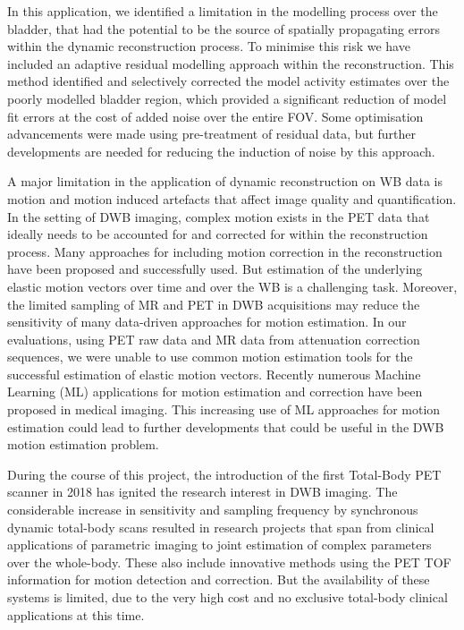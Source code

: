 In this application, we identified a limitation in the modelling process over the bladder, that had the potential to be the source of spatially propagating errors within the dynamic reconstruction process. 
To minimise this risk we have included an adaptive residual modelling approach within the reconstruction. This method identified and selectively corrected the model activity estimates over the poorly modelled bladder region, which provided a significant reduction of model fit errors at the cost of added noise over the entire FOV. Some optimisation advancements were made using pre-treatment of residual data, but further developments are needed for reducing the induction of noise by this approach. 

A major limitation in the application of dynamic reconstruction on WB data is motion and motion induced artefacts that affect image quality and quantification. 
In the setting of DWB imaging, complex motion exists in the PET data that ideally needs to be accounted for and corrected for within the reconstruction process. 
Many approaches for including motion correction in the reconstruction have been proposed and successfully used. But estimation of the underlying elastic motion vectors over time and over the WB is a challenging task. Moreover, the limited sampling of MR and PET in DWB acquisitions may reduce the sensitivity of many data-driven approaches for motion estimation. In our evaluations, using PET raw data and MR data from attenuation correction sequences, we were unable to use common motion estimation tools for the successful estimation of elastic motion vectors.
Recently numerous Machine Learning (ML) applications for motion estimation and correction have been proposed in medical imaging. This increasing use of ML approaches for motion estimation could lead to further developments that could be useful in the DWB motion estimation problem.

During the course of this project, the introduction of the first Total-Body PET scanner in 2018 has ignited the research interest in DWB imaging. The considerable increase in sensitivity and sampling frequency by synchronous dynamic total-body scans resulted in research projects that span from clinical applications of parametric imaging to joint estimation of complex parameters over the whole-body. These also include innovative methods using the PET TOF information for motion detection and correction.
But the availability of these systems is limited, due to the very high cost and no exclusive total-body clinical applications at this time.

